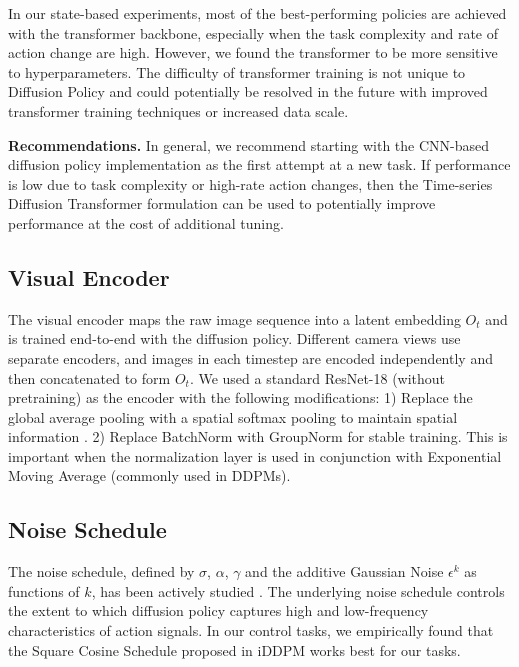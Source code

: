 \documentclass[Afour,sageh,times]{sagej}
\begin{document}
In our state-based experiments, most of the best-performing policies are achieved with the transformer backbone, especially when the task complexity and rate of action change are high. However, we found the transformer to be more sensitive to hyperparameters. The difficulty of transformer training \cite{liu2020understanding} is not unique to Diffusion Policy and could potentially be resolved in the future with improved transformer training techniques or increased data scale.

\textbf{Recommendations.}
 In general, we recommend starting with the CNN-based diffusion policy implementation as the first attempt at a new task. If performance is low due to task complexity or high-rate action changes, then the Time-series Diffusion Transformer formulation can be used to potentially improve performance at the cost of additional tuning.

\subsection{Visual Encoder}
\label{sec:method-visual}
The visual encoder  maps the raw image sequence into a latent embedding $O_t$ and is trained end-to-end with the diffusion policy.
Different camera views use separate encoders, and images in each timestep are encoded independently and then concatenated to form $O_t$.
We used a standard ResNet-18 (without pretraining) as the encoder with the following modifications:
1) Replace the global average pooling with a spatial softmax pooling to maintain spatial information \cite{robomimic}.
2) Replace BatchNorm with GroupNorm \cite{groupnorm} for stable training. This is important when the normalization layer is used in conjunction with Exponential Moving Average \cite{he2020moco} (commonly used in DDPMs).

\subsection{Noise Schedule}
\label{sec:method-noise-schedule}
The noise schedule, defined by $\sigma$, $\alpha$, $\gamma$ and the additive Gaussian Noise $\epsilon^k$ as functions of $k$, has been actively studied \cite{ho2020denoising, nichol2021improved}.  The underlying noise schedule controls the extent to which diffusion policy captures high and low-frequency characteristics of action signals. In our control tasks, we empirically found that the Square Cosine Schedule proposed in iDDPM \cite{nichol2021improved} works best for our tasks.
\end{document}
